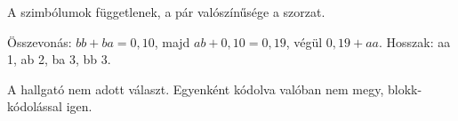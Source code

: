 A szimbólumok függetlenek, a pár valószínűsége a szorzat.

\begin{center}\end{center}

Összevonás: $bb+ba=0{,}10$, majd $ab+0{,}10=0{,}19$, végül $0{,}19+aa$. Hosszak: aa 1, ab 2, ba 3, bb 3.

\begin{center}\end{center}

\begin{center}\end{center}

\begin{center}\end{center}
\begin{figyelem}[Javítás]
A hallgató nem adott választ. Egyenként kódolva valóban nem megy, blokk-kódolással igen.
\end{figyelem}
\begin{eredmeny}

\begin{center}\end{center}
\end{eredmeny}
